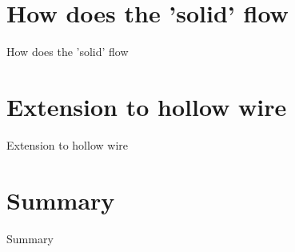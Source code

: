 \documentclass{beamer}
\begin{document}
\section{How does the 'solid' flow}

\begin{frame}{How does the 'solid' flow}


\end{frame}

\section{Extension to hollow wire}

\begin{frame}{Extension to hollow wire}


\end{frame}

\section{Summary}

\begin{frame}{Summary}


\end{frame}
\end{document}

